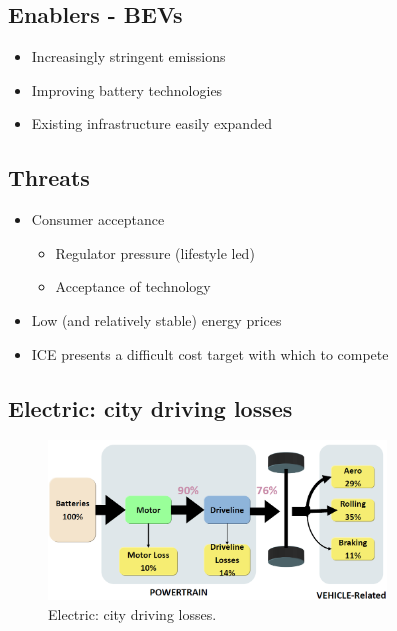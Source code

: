 \subsection{Enablers - BEVs}
\begin{itemize}
    \item Increasingly stringent emissions
    \item Improving battery technologies
    \item Existing infrastructure easily expanded
\end{itemize}
\subsection{Threats}
\begin{itemize}
    \item Consumer acceptance
          \begin{itemize}
              \item Regulator pressure (lifestyle led)
              \item Acceptance of technology
          \end{itemize}
    \item Low (and relatively stable) energy prices
    \item ICE presents a difficult cost target with which to compete
\end{itemize}
\subsection{Electric: city driving losses}
\begin{figure}[H]
    \centering
    \includegraphics[width = 0.8\textwidth]{img/figure107.png}
    \caption{Electric: city driving losses.}
\end{figure}
